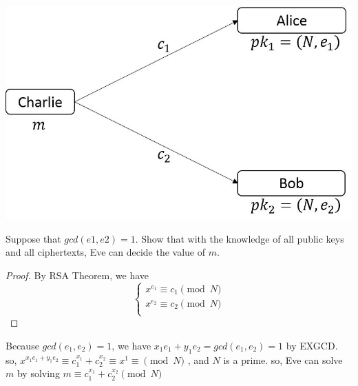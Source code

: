 \documentclass{article}
\theoremstyle{break}
\begin{document}
\begin{enumerate}
    {\centering\includegraphics[scale=1]{6.jpg}
 
    }
    Suppose that $gcd(e1,e2) = 1$. Show that with the knowledge of all public keys 
    and all ciphertexts, Eve can decide the value of $m$.
    \begin{proof}
        By RSA Theorem, we have\\
        $$
        \left\{
        \begin{aligned}
            x^{e_1} \equiv c_1 \pmod {N}\\
            x^{e_2} \equiv c_2 \pmod {N }\\
        \end{aligned}
        \right.
        $$
    \end{proof}
    Because $gcd(e_1, e_2) =1$, we have $x_1e_1+y_1e_2 = gcd(e_1, e_2) =1$ by EXGCD.\\
    so, $x^{x_1e_1+y_1e_2} \equiv c_1^{x_1} + c_2^{x_2} \equiv x^{1} \equiv \pmod{N}$ , and $N$ is a prime.
    so, Eve can solve $m$ by solving $m \equiv c_1^{x_1} + c_2^{x_2}  \pmod{ N} $\\
\end{enumerate}
\end{document}

